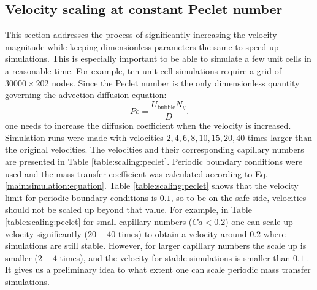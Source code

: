 \documentclass[preprint,12pt]{elsarticle}
\newcommand{\beq}{\begin{equation}}
\newcommand{\feq}{\end{equation}}
\newcommand{\ububble}{U_{\mathrm{bubble}}}
\newcommand{\omegaminus}{\omega_{-}}
\begin{document}
\subsection{Velocity scaling at constant Peclet number}
\label{section:keeping:peclet}
This section addresses the process of significantly increasing the
velocity magnitude while keeping dimensionless parameters the same to
speed up                                      
simulations. This is especially important to be able to simulate a few unit cells in a reasonable time.
For example, ten unit cell simulations require a grid of $30000\times202$ nodes.
Since the Peclet number is the only dimensionless quantity governing
the advection-diffusion equation:
\beq
Pe=\frac{\ububble N_y}{D}.
\feq
one needs to increase the diffusion coefficient when the velocity is increased. Simulation runs were made with
velocities $2,4,6,8,10,15,20,40$ times larger than the original velocities. The velocities and
their corresponding capillary numbers are presented in Table \ref{table:scaling:peclet}. Periodic
boundary conditions were used and the mass transfer coefficient was calculated according to Eq.
\ref{main:simulation:equation}. Table \ref{table:scaling:peclet} shows that the velocity limit
for  periodic boundary conditions is $0.1$, so to be on the safe side, velocities should not be scaled
up beyond that value.  For example, in Table \ref{table:scaling:peclet} for small capillary numbers ($Ca<0.2$)  one can scale up velocity significantly ($20-40$ times) to obtain a velocity around $0.2$ where simulations are still stable. However, for larger capillary numbers the scale up is smaller ($2-4$ times), and the velocity for stable simulations is smaller than $0.1$ .   %
It gives us a
preliminary idea to what extent one can scale periodic mass transfer simulations. 
\end{document}
